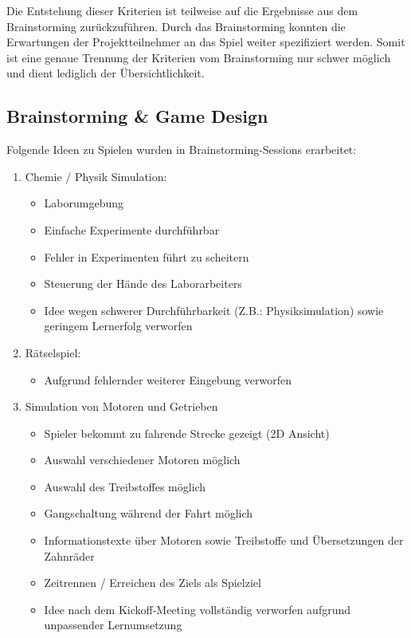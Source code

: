 	Die Entstehung dieser Kriterien ist teilweise auf die Ergebnisse aus dem Brainstorming zurückzuführen. Durch das Brainstorming konnten die Erwartungen der Projektteilnehmer an das Spiel weiter spezifiziert werden. Somit ist eine genaue Trennung der Kriterien vom Brainstorming nur schwer möglich und dient lediglich der Übersichtlichkeit.

\subsection{Brainstorming \& Game Design}\label{ssec:idee}
	Folgende Ideen zu Spielen wurden in Brainstorming-Sessions erarbeitet:
	\begin{enumerate}
		\item{Chemie / Physik Simulation:}
		\begin{itemize}
			\item{Laborumgebung}
			\item{Einfache Experimente durchführbar}
			\item{Fehler in Experimenten führt zu scheitern}
			\item{Steuerung der Hände des Laborarbeiters}
			\item{Idee wegen schwerer Durchführbarkeit (Z.B.: Physiksimulation) sowie geringem Lernerfolg verworfen}
		\end{itemize}
		\item{Rätselspiel:}
		\begin{itemize}
			\item{Aufgrund fehlernder weiterer Eingebung verworfen}
		\end{itemize}
		\item{Simulation von Motoren und Getrieben}
		\begin{itemize}
			\item{Spieler bekommt zu fahrende Strecke gezeigt (2D Ansicht)}
			\item{Auswahl verschiedener Motoren möglich}
			\item{Auswahl des Treibstoffes möglich}
			\item{Gangschaltung während der Fahrt möglich}
			\item{Informationstexte über Motoren sowie Treibstoffe und Übersetzungen der Zahnräder}
			\item{Zeitrennen / Erreichen des Ziels als Spielziel}
			\item{Idee nach dem Kickoff-Meeting vollständig verworfen aufgrund unpassender Lernumsetzung}
		\end{itemize}

\end{enumerate}
